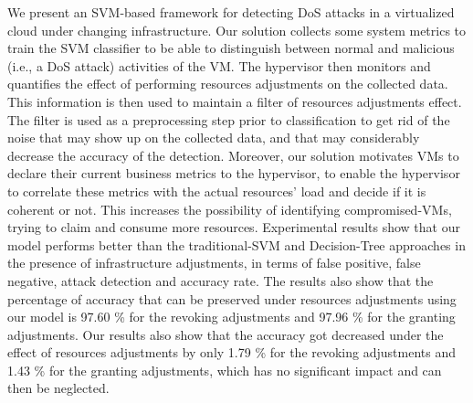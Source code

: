 \documentclass[twocolumn]{bmcart}%
\begin{document}
We present an SVM-based framework for detecting DoS attacks in a virtualized cloud under changing infrastructure. Our solution collects some system metrics to train the SVM classifier to be able to distinguish between normal and malicious (i.e., a DoS attack) activities of the VM. The hypervisor then monitors and quantifies the effect of performing resources adjustments on the collected data. This information is then used to maintain a filter of resources adjustments effect. The filter is used as a preprocessing step prior to classification to get rid of the noise that may show up on the collected data, and that may considerably decrease the accuracy of the detection. Moreover, our solution motivates VMs to declare their current business metrics to the hypervisor, to enable the hypervisor to correlate these metrics with the actual resources' load and decide if it is coherent or not. This increases the possibility of identifying compromised-VMs, trying to claim and consume more resources. Experimental results show that our model performs better than the traditional-SVM and Decision-Tree approaches in the presence of infrastructure adjustments, in terms of false positive, false negative, attack detection and accuracy rate. The results also show that the percentage of accuracy that can be preserved under resources adjustments using our model is 97.60 \% for the revoking adjustments and 97.96 \% for the granting adjustments. Our results also show that the accuracy got decreased under the effect of resources adjustments by only 1.79 \%  for the revoking adjustments and 1.43 \% for the granting adjustments, which has no significant impact and can then be neglected.




\end{document}
